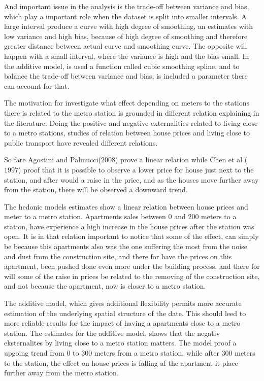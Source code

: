 And important issue in the analysis is the trade-off between variance and 
bias, which play a important role when the dataset is split into smaller 
intervals. A large interval produce a curve with high degree of smoothing, an 
estimates with low variance and high bias, because of high degree of 
smoothing and therefore greater distance between actual curve and smoothing 
curve.  The opposite will happen with a small interval, where the variance is 
high and the bias small.  In the additive model, is used a function called 
cubic smoothing spline, and to balance the trade-off between variance and 
bias, is included a parameter there can account for that. 

The motivation for investigate what effect depending on meters to the 
stations there is related to the metro station is grounded in different 
relation explaining in the literature. Doing the positive and negative 
externalities related to living close to a metro stations, studies of 
relation between house prices and living close to public transport have 
revealed different relations. 

So fare Agostini and Palmucci($2008$) prove a linear relation while Chen et al (
 $1997$) proof that it is possible to observe a lower price for house just next 
to the station, and after would a raise in the price, and as the houses move 
further away from the station, there will be observed a downward trend. 

The hedonic models estimates show a linear relation between house prices and 
meter to a metro station. Apartments sales between $0$ and $200$ meters to a 
station, have experience a high increase in the house prices after the 
station was open. It is in that relation important to notice that some of the 
effect, can simply be because this apartments also was the one suffering the 
most from the noise and dust from the construction site, and there for have 
the prices on this apartment, been pushed done even more under the building 
process, and there for will some of the raise in prices be related to the 
removing of the construction site, and not because the apartment, now is 
closer to a metro station.   

The additive model, which gives additional flexibility permits more accurate 
estimation of the underlying spatial structure of the date. This should leed 
to more reliable results for the impact of having a apartments close to a 
metro station.  
The estimates for the additive model, shows that the negativ eksternalites by 
living close to a metro station matters. The model proof a upgoing trend from $0$
to 300 meters from a metro station, while after $300$ meters to the station, 
the effect on house prices is falling af the apartment it place further away 
from the metro station.   

